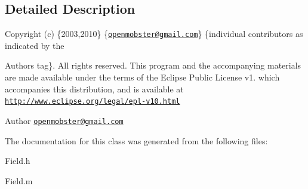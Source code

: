 \subsection{\-Detailed \-Description}
\-Copyright (c) \{2003,2010\} \{\href{mailto:openmobster@gmail.com}{\tt openmobster@gmail.\-com}\} \{individual contributors as indicated by the \begin{DoxyAuthor}{\-Authors}
tag\}. \-All rights reserved. \-This program and the accompanying materials are made available under the terms of the \-Eclipse \-Public \-License v1. which accompanies this distribution, and is available at \href{http://www.eclipse.org/legal/epl-v10.html}{\tt http\-://www.\-eclipse.\-org/legal/epl-\/v10.\-html}
\end{DoxyAuthor}
\begin{DoxyAuthor}{\-Author}
\href{mailto:openmobster@gmail.com}{\tt openmobster@gmail.\-com} 
\end{DoxyAuthor}


\-The documentation for this class was generated from the following files\-:\begin{DoxyCompactItemize}
\item 
\-Field.\-h\item 
\-Field.\-m\end{DoxyCompactItemize}
